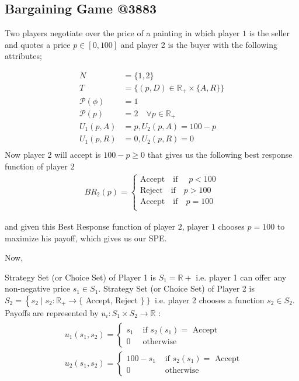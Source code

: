 \documentclass[12pt,a4paper,fleqn]{article}
\begin{document}
    \subsection{Bargaining Game @3883}
    Two players negotiate over the price of a painting in which player \(1\) is the seller and quotes a price \(p \in \left[ 0,100 \right] \) and player 2 is the buyer with the following attributes;   
  
  \begin{fleqn}
   \begin{align*}
    N&=\{1,2\}\\
    T&=\{(p,D) \in \mathbb{R}_{+} \times \{A,R\}\}\\
    \mathcal{P}(\phi)&=1\\
    \mathcal{P}(p)&=2 \quad \forall p \in \mathbb{R}_{+}\\
    U_{1}(p,A)&=p , U_{2}(p,A)=100-p\\
    U_{1}(p,R)&=0 , U_{2}(p,R)=0\\
   \end{align*}
   Now player 2 will accept is \(100-p \geq 0\) that gives us the following best response function of player \(2\)   
   \begin{align*}
    BR_{2}(p)=\begin{cases}
        \mathrm{Accept} \quad \text{if } \quad p<100\\
        \mathrm{Reject}  \quad \text{if}   \quad p>100\\
        \mathrm{Accept}\quad  \text{if} \quad p=100\\
    \end{cases}
   \end{align*}
 \end{fleqn}
 and given this Best Response function of player \(2\), player \(1\) chooses \(p=100\) to maximize his payoff, which gives us our SPE. 

 Now,

 Strategy Set (or Choice Set) of Player 1 is \(S_1=\mathbb{R}+\) i.e. player 1 can offer any non-negative price \(s_1 \in S_1\).
    Strategy Set (or Choice Set) of Player 2 is \(S_2=\left\{s_2 \mid s_2: \mathbb{R}_{+} \rightarrow\{\right.\) Accept, Reject \(\left.\}\right\}\) i.e. player 2 chooses a function \(s_2 \in S_2\).
    Payoffs are represented by \(u_i: S_1 \times S_2 \rightarrow \mathbb{R}\) :
   \begin{align*}
    \begin{aligned}
     & u_1\left(s_1, s_2\right)= \begin{cases}s_1 & \text { if } s_2\left(s_1\right)=\text { Accept } \\
     0 & \text { otherwise }\end{cases} \\
     &  u_2\left(s_1, s_2\right)= \begin{cases}100-s_1 & \text { if } s_2\left(s_1\right)=\text { Accept } \\
     0 & \text { otherwise }\end{cases}
    \end{aligned}
   \end{align*}
   
\end{document}
